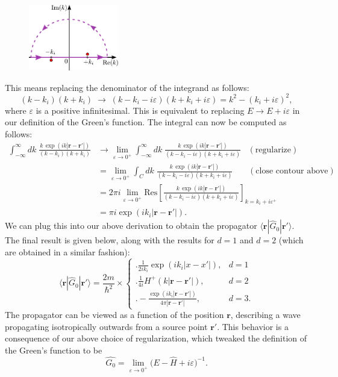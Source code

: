 \documentclass[pra,12pt]{revtex4}
\begin{document}
\begin{figure}[h!]
  \centering\includegraphics[width=0.35\textwidth]{greencontour}
\end{figure}

This means replacing the denominator of the integrand as
follows:
$$(k - k_i)(k+k_i) \;\rightarrow\; (k - k_i - i\varepsilon)(k+k_i+i\varepsilon) = k^2 - (k_i+i\varepsilon)^2,$$
where $\varepsilon$ is a positive infinitesimal.  This is equivalent
to replacing $E \rightarrow E + i\varepsilon$ in our definition of the
Green's function.  The integral can now be computed as
follows:
$$\begin{aligned}\int_{-\infty}^\infty dk \; \frac{\displaystyle k\, \exp\left(ik|\mathbf{r}-\mathbf{r}'|\right)}{(k - k_i)(k+k_i)} &\rightarrow \lim_{\varepsilon \rightarrow 0^+} \int_{-\infty}^\infty dk \; \frac{\displaystyle k\, \exp\left(ik|\mathbf{r}-\mathbf{r}'|\right)}{(k - k_i - i\varepsilon)(k+k_i+i\varepsilon)}\;\;\; (\text{regularize}) \\ &= \lim_{\varepsilon \rightarrow 0^+} \int_C dk \; \frac{\displaystyle k\, \exp\left(ik|\mathbf{r}-\mathbf{r}'|\right)}{(k - k_i - i\varepsilon)(k+k_i+i\varepsilon)} \quad\;\;\; (\text{close contour above}) \\ &= 2\pi i \lim_{\varepsilon \rightarrow 0^+} \mathrm{Res}\left[\frac{\displaystyle k\, \exp\left(ik|\mathbf{r}-\mathbf{r}'|\right)}{(k - k_i - i\varepsilon)(k+k_i+i\varepsilon)}\right]_{k=k_i+i\varepsilon^+} \\ &= \pi i \exp\left(ik_i|\mathbf{r}-\mathbf{r}'|\right).\end{aligned}$$
We can plug this into our above derivation to obtain the propagator
$\langle\mathbf{r}|\hat{G}_0|\mathbf{r}'\rangle$.  The final result is
given below, along with the results for $d=1$ and $d=2$ (which are
obtained in a similar fashion):
$$\boxed{\;\;\;\langle\mathbf{r}|\hat{G}_0|\mathbf{r}'\rangle = \frac{2m}{\hbar^2} \times \begin{cases} \Bigg.\displaystyle\frac{1}{2ik_i} \exp\left(ik_i|x-x'|\right),& d=1\\ \Bigg. \displaystyle\frac{1}{4i} H^+(k|\mathbf{r}-\mathbf{r'}|), & d=2 \\ \displaystyle \Bigg. - \frac{\exp\left(ik_i|\mathbf{r}-\mathbf{r}'|\right)}{4\pi|\mathbf{r}-\mathbf{r}'|}, & d = 3.  \end{cases}\;\;\;}$$
The propagator can be viewed as a function of the position
$\mathbf{r}$, describing a wave propagating isotropically outwards
from a source point $\mathbf{r}'$.  This behavior is a consequence of
our above choice of regularization, which tweaked the definition of
the Green's function to be
$$\boxed{\quad\hat{G_0} = \lim_{\varepsilon\rightarrow 0^+} \big(E - \hat{H} + i \varepsilon\big)^{-1}.\quad}$$
\end{document}
